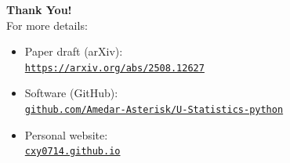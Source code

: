 \documentclass[9pt]{beamer}
\theoremstyle{mystyle}
\theoremstyle{mystyletwo}
\def\[{\left[}
\def\[{\left[}
\begin{document}
\begin{frame}
\frametitle{}
    \centering
    \vspace{2cm}
    {\Huge \textbf{Thank You!}} \\[1.5em]

    {\large For more details:} \\[1em]

    \begin{itemize}\setlength\itemsep{0.8em}
        \item Paper draft (arXiv): \\
        \href{https://arxiv.org/abs/2508.12627}{\texttt{https://arxiv.org/abs/2508.12627}}
        
        \item Software (GitHub): \\
        \href{https://github.com/Amedar-Asterisk/U-Statistics-python}{\texttt{github.com/Amedar-Asterisk/U-Statistics-python}}
        
        \item Personal website: \\
        \href{https://cxy0714.github.io/}{\texttt{cxy0714.github.io}}
    \end{itemize}

    \vfill
\end{frame}
\end{document}
